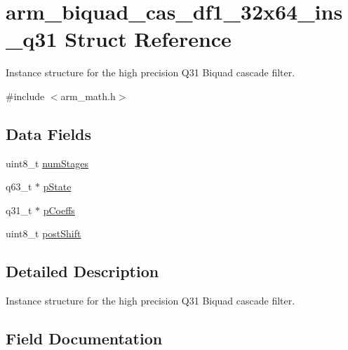 \hypertarget{structarm__biquad__cas__df1__32x64__ins__q31}{}\section{arm\+\_\+biquad\+\_\+cas\+\_\+df1\+\_\+32x64\+\_\+ins\+\_\+q31 Struct Reference}
\label{structarm__biquad__cas__df1__32x64__ins__q31}


Instance structure for the high precision Q31 Biquad cascade filter.  




{\ttfamily \#include $<$arm\+\_\+math.\+h$>$}

\subsection*{Data Fields}
\begin{DoxyCompactItemize}
\item 
uint8\+\_\+t \mbox{\hyperlink{structarm__biquad__cas__df1__32x64__ins__q31_a3615af038f56917909e0370c11bc2ec7}{num\+Stages}}
\item 
q63\+\_\+t $\ast$ \mbox{\hyperlink{structarm__biquad__cas__df1__32x64__ins__q31_adefeb77301cc04e4d7d22f323029d588}{p\+State}}
\item 
q31\+\_\+t $\ast$ \mbox{\hyperlink{structarm__biquad__cas__df1__32x64__ins__q31_a68888e36167d81cb7836db10367a1682}{p\+Coeffs}}
\item 
uint8\+\_\+t \mbox{\hyperlink{structarm__biquad__cas__df1__32x64__ins__q31_a74050e9f36542bd56f4052381a82ae8f}{post\+Shift}}
\end{DoxyCompactItemize}


\subsection{Detailed Description}
Instance structure for the high precision Q31 Biquad cascade filter. 

\subsection{Field Documentation}
\mbox{\label{structarm__biquad__cas__df1__32x64__ins__q31_a3615af038f56917909e0370c11bc2ec7}} 
